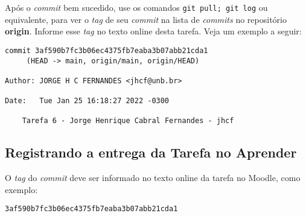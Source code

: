 Após o \textit{commit} bem sucedido, use os comandos \verb|git pull; git log| ou equivalente, para ver o \textit{tag} de seu \textit{commit} na lista de \textit{commits} no repositório \textbf{origin}. Informe esse \textit{tag} no texto online desta tarefa. 
Veja um exemplo a seguir:

\begin{verbatim}
commit 3af590b7fc3b06ec4375fb7eaba3b07abb21cda1 
     (HEAD -> main, origin/main, origin/HEAD)

Author: JORGE H C FERNANDES <jhcf@unb.br>

Date:   Tue Jan 25 16:18:27 2022 -0300

    Tarefa 6 - Jorge Henrique Cabral Fernandes - jhcf
\end{verbatim}

\subsection{Registrando a entrega da Tarefa no Aprender}

O \textit{tag} do \textit{commit} deve ser informado no texto online da tarefa no Moodle, como exemplo:
\begin{verbatim}
3af590b7fc3b06ec4375fb7eaba3b07abb21cda1
\end{verbatim}

